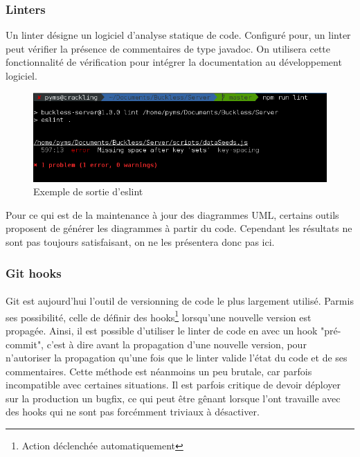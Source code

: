     \subsubsection{Linters}
        Un linter désigne un logiciel d'analyse statique de code. Configuré pour, un linter peut vérifier
        la présence de commentaires de type javadoc. On utilisera cette fonctionnalité de vérification
        pour intégrer la documentation au développement logiciel.

        \begin{figure}[ht]
            \centering
            \includegraphics[width=\textwidth]{./assets/eslint.png}
            \caption{Exemple de sortie d'eslint}
        \end{figure}

        Pour ce qui est de la maintenance à jour des diagrammes UML, certains outils proposent de générer
        les diagrammes à partir du code. Cependant les résultats ne sont pas toujours satisfaisant, on
        ne les présentera donc pas ici.

    \newpage
    \subsubsection{Git hooks}
        \paragraph{}
            Git est aujourd'hui l'outil de versionning de code le plus largement utilisé. Parmis ses possibilité,
            celle de définir des hooks\footnote{Action déclenchée automatiquement} lorsqu'une nouvelle version est propagée.
            Ainsi, il est possible d'utiliser le linter de code en avec un hook "pré-commit", c'est à dire avant la
            propagation d'une nouvelle version, pour n'autoriser la propagation qu'une fois que le linter valide l'état du code et
            de ses commentaires.
            Cette méthode est néanmoins un peu brutale, car parfois incompatible avec certaines situations.
            Il est parfois critique de devoir déployer sur la production un bugfix, ce qui peut être gênant lorsque l'ont travaille avec des hooks qui ne sont pas
            forcémment triviaux à désactiver.

